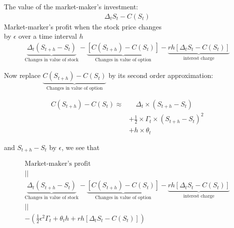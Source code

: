 \begin{frame}[fragile,t]
 \begin{center}
   The value of the market-maker's investment:\\
   \begin{align*}
     \Delta_t S_t -C(S_t)
   \end{align*}
   \vfill
   \mySeparateLine
   \vfill
   Market-marker's profit when the stock price changes \\
   by $\epsilon$ over a time interval $h$
   \bigskip
   \begin{align*}
     \underbrace{\Delta_t (S_{t+h}-S_t)}_{\text{Changes in value of stock}} -
     \underbrace{\left[C(S_{t+h})-C(S_t)\right]}_{\text{Changes in value of option}} -
     \underbrace{rh \left[\Delta_t S_t - C(S_t)\right]}_{\text{interest charge}}
   \end{align*}
 \end{center}
\end{frame}
\begin{frame}[fragile,t]
 \begin{center}
   Now replace $\underbrace{C(S_{t+h})-C(S_t)}_{\text{Changes in value of option}}$ by its second order approximation:

   \bigskip
   \begin{align*}
     C\left(S_{t+h}\right) - C(S_t)  \approx & \quad \Delta_t\times \left(S_{t+h}-S_t\right)                  \\
                                             & + \frac{1}{2} \times \Gamma_t \times\left(S_{t+h}-S_t\right)^2 \\
                                             & + h\times \theta_t
   \end{align*}
   \bigskip

   and $S_{t+h}-S_t$ by  $\epsilon$, we see that
 \end{center}
\end{frame}
\begin{frame}[fragile]
  \begin{gather*}
    \text{Market-maker's profit} \\ ||\\
     \underbrace{\Delta_t (S_{t+h}-S_t)}_{\text{Changes in value of stock}} -
     \underbrace{\left[C(S_{t+h})-C(S_t)\right]}_{\text{Changes in value of option}} -
     \underbrace{rh \left[\Delta_t S_t - C(S_t)\right]}_{\text{interest charge}} \\
     || \\
     -\left(\frac{1}{2}\epsilon^2 \Gamma_t + \theta_t h + r h \left[ \Delta_t S_t -C(S_t)\right]\right)
   \end{gather*}
\end{frame}
